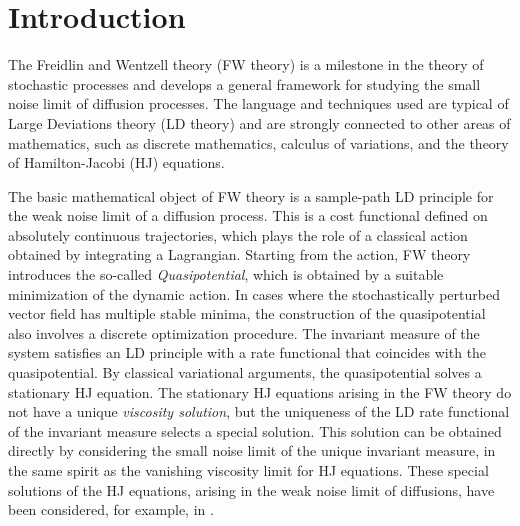 \documentclass[reqno]{amsart}
\theoremstyle{plain}
\theoremstyle{definition}
\theoremstyle{remark}
\numberwithin{equation}{section}
\numberwithin{theorem}{section}
\newcommand{\<}{\langle}
\renewcommand{\>}{\rangle}
\begin{document}

\maketitle
\thispagestyle{empty}

\section{Introduction}

The Freidlin and Wentzell theory (FW theory) \cite{FW} is a milestone in the theory of stochastic processes and develops a general framework for studying the small noise limit of diffusion processes. The language and techniques used are typical of Large Deviations theory (LD theory) and are strongly connected to other areas of mathematics, such as discrete mathematics, calculus of variations, and the theory of Hamilton-Jacobi (HJ) equations.

\smallskip
The basic mathematical object of FW theory is a sample-path LD principle for the weak noise limit of a diffusion process. This is a cost functional defined on absolutely continuous trajectories, which plays the role of a classical action obtained by integrating a Lagrangian. Starting from the action, FW theory introduces the so-called {\it Quasipotential}, which is obtained by a suitable minimization of the dynamic action. In cases where the stochastically perturbed vector field has multiple stable minima, the construction of the quasipotential also involves a discrete optimization procedure. The invariant measure of the system satisfies an LD principle with a rate functional that coincides with the quasipotential. By classical variational arguments, the quasipotential solves a stationary HJ equation. The stationary HJ equations arising in the FW theory do not have a unique {\it viscosity solution}, but the uniqueness of the LD rate functional of the invariant measure selects a special solution. This solution can be obtained directly by considering the small noise limit of the unique invariant measure, in the same spirit as the vanishing viscosity limit for HJ equations. These special solutions of the HJ equations, arising in the weak noise limit of diffusions, have been considered, for example, in \cite{FG,GL,GT,J}.
\end{document}
